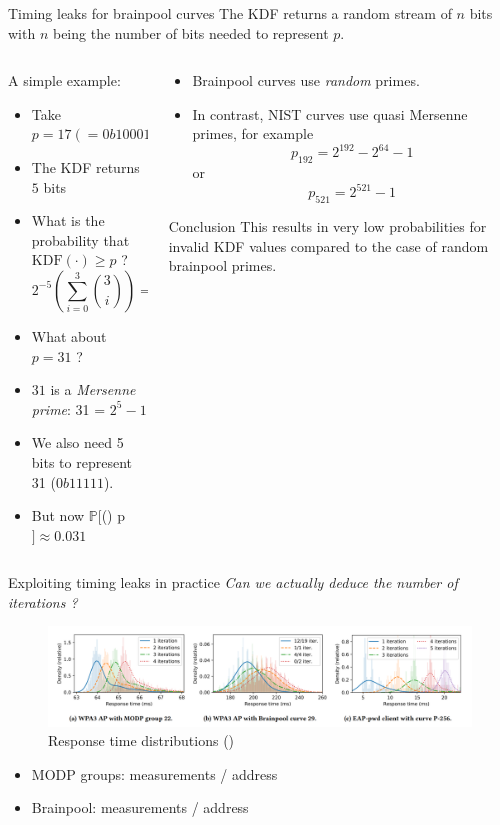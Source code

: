 \documentclass[xcolor=table]{bredelebeamer}
\begin{document}
\begin{frame}{Timing leaks for brainpool curves}
    The KDF returns a random stream of $n$ bits with $n$ being the number of bits needed to represent $p$.
    \begin{columns}
\begin{column}{0.6\textwidth}  %
A simple example:
\begin{itemize}
    \item Take $p = 17 (=0b10001)$
    \item The KDF returns $5$ bits
    \item What is the probability that $\text{KDF}(\cdot) \geq p$ ?
    $$ 2^{-5} \left( \sum_{i=0}^3 {3 \choose i}\right) = 0.25$$
    \item What about $p = 31$ ?
    \item $31$ is a \textit{Mersenne prime}: 31 = $2^5-1$
    \item We also need 5 bits to represent 31 ($0b11111$).
    \item But now $\mathbb{P}[$(\cdot) \geq p$] \approx 0.031$
\end{itemize}
\end{column}
\begin{column}{0.4\textwidth}
\begin{itemize}
    \item Brainpool curves use \textit{random} primes.
    \item In contrast, NIST curves use quasi Mersenne primes, for example
    $$p_{192} = 2^{192}  - 2^{64}  - 1$$
    or
    $$p_{521} = 2^{521}  - 1 $$
\end{itemize}
\begin{exampleblock}{Conclusion}
This results in very low probabilities for invalid KDF values compared to the case of random brainpool primes.
\end{exampleblock}

\end{column}
\end{columns}
\end{frame}
\begin{frame}{Exploiting timing leaks in practice}
\textit{Can we actually deduce the number of iterations ?}
\begin{figure}
    \centering
    \includegraphics[width=1\textwidth]{dragonflytiming.png}
    \caption{Response time distributions (\cite{vanhoef-sp2020-dragonblood})}
    \label{fig:my_label}
\end{figure}
\begin{itemize}
    \item MODP groups:  measurements / address
    \item Brainpool:  measurements / address
\end{itemize}
\end{frame}
\end{document}
